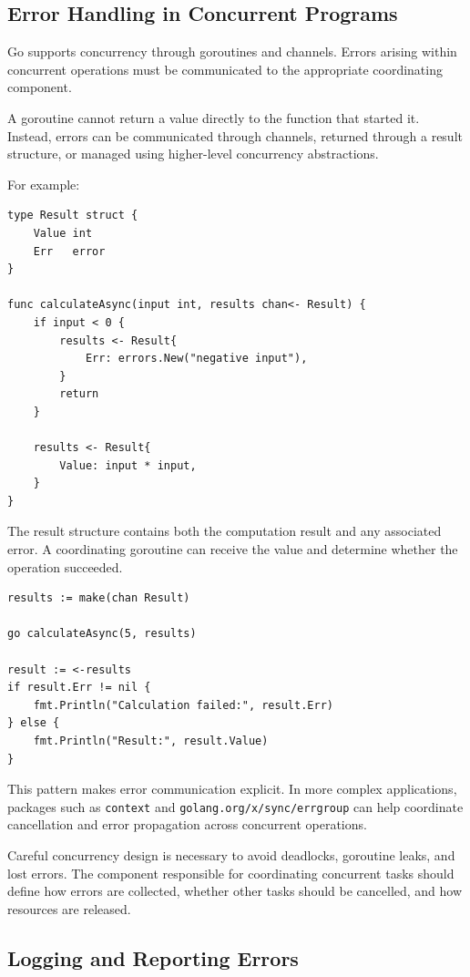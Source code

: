 \subsection{Error Handling in Concurrent Programs}

Go supports concurrency through goroutines and channels. Errors arising within concurrent operations must be communicated to the appropriate coordinating component.

A goroutine cannot return a value directly to the function that started it. Instead, errors can be communicated through channels, returned through a result structure, or managed using higher-level concurrency abstractions.

For example:

\begin{lstlisting}
type Result struct {
    Value int
    Err   error
}

func calculateAsync(input int, results chan<- Result) {
    if input < 0 {
        results <- Result{
            Err: errors.New("negative input"),
        }
        return
    }

    results <- Result{
        Value: input * input,
    }
}
\end{lstlisting}

The result structure contains both the computation result and any associated error. A coordinating goroutine can receive the value and determine whether the operation succeeded.

\begin{lstlisting}
results := make(chan Result)

go calculateAsync(5, results)

result := <-results
if result.Err != nil {
    fmt.Println("Calculation failed:", result.Err)
} else {
    fmt.Println("Result:", result.Value)
}
\end{lstlisting}

This pattern makes error communication explicit. In more complex applications, packages such as \texttt{context} and \texttt{golang.org/x/sync/errgroup} can help coordinate cancellation and error propagation across concurrent operations.

Careful concurrency design is necessary to avoid deadlocks, goroutine leaks, and lost errors. The component responsible for coordinating concurrent tasks should define how errors are collected, whether other tasks should be cancelled, and how resources are released.

\subsection{Logging and Reporting Errors}

